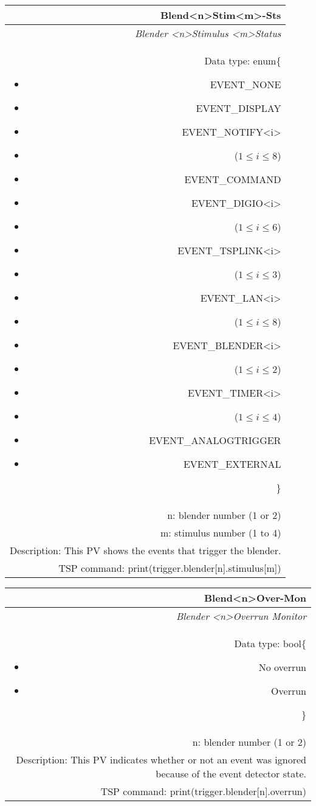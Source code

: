 \documentclass[openany]{article}
\begin{document}
		\begin{tabular}{N}
			\hline
			\bfseries Blend{\textless n\textgreater}Stim{\textless m\textgreater}-Sts\label{pv:blendstim-sts} \\ \hline
			\emph{Blender \textless n\textgreater Stimulus \textless m\textgreater Status} \\
			Data type: enum\{\begin{itemize}[noitemsep]
				\small
				\item[] EVENT\_NONE
				\item[] EVENT\_DISPLAY
				\item[] EVENT\_NOTIFY\textless i\textgreater
				\item[] ($1\leq i\leq 8$)
				\item[] EVENT\_COMMAND
				\item[] EVENT\_DIGIO\textless i\textgreater
				\item[] ($1\leq i\leq 6$)
				\item[] EVENT\_TSPLINK\textless i\textgreater
				\item[] ($1\leq i\leq 3$)
				\item[] EVENT\_LAN\textless i\textgreater
				\item[] ($1\leq i\leq 8$)
				\item[] EVENT\_BLENDER\textless i\textgreater 
				\item[] ($1\leq i\leq 2$)
				\item[] EVENT\_TIMER\textless i\textgreater
				\item[] ($1\leq i\leq 4$)
				\item[] EVENT\_ANALOGTRIGGER
				\item[] EVENT\_EXTERNAL
			\end{itemize}\} \\
			n: blender number (1 or 2) \\
			m: stimulus number (1 to 4) \\
			Description: This PV shows the events that trigger the blender. \\
			TSP command: print(trigger.blender[n].stimulus[m])
		\end{tabular}

		\begin{tabular}{N}
			\hline
			\bfseries Blend{\textless n\textgreater}Over-Mon\label{pv:blendover-mon} \\ \hline
			\emph{Blender \textless n\textgreater Overrun Monitor} \\
			Data type: bool\{\begin{itemize}[noitemsep]
				\small
				\item[] No overrun
				\item[] Overrun
			\end{itemize}\} \\
			n: blender number (1 or 2) \\
			Description: This PV indicates whether or not an event was ignored because of the event detector state. \\
			TSP command: print(trigger.blender[n].overrun)
		\end{tabular}
\end{document}
